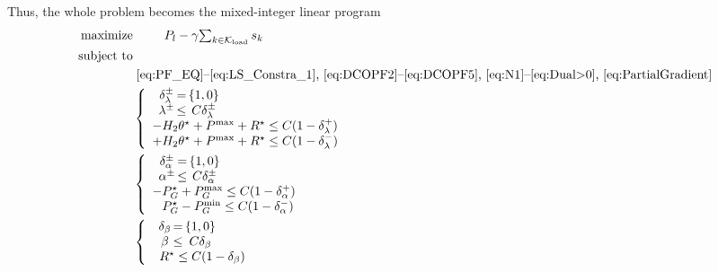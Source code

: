 \documentclass[twocolumn,english,final,journal]{IEEEtran}
\theoremstyle{plain}
\theoremstyle{definition}
\begin{document}
Thus, the whole problem becomes the mixed-integer linear program
\begin{align}
\mbox{maximize}\;\:\qquad & P_{l}-\gamma\mbox{\ensuremath{\sum_{k\in\mathcal{K}_{\textrm{load}}}s_{k}}}\nonumber \\
\mbox{ subject to\qquad\,\ }\nonumber \\
 & \mbox{\negthickspace\negthickspace\negthickspace\negthickspace\negthickspace\negthickspace\negthickspace\negthickspace\eqref{eq:PF_EQ}--\eqref{eq:LS_Constra_1}, \eqref{eq:DCOPF2}--\eqref{eq:DCOPF5}, \eqref{eq:N1}--\mbox{\eqref{eq:Dual>0}, \eqref{eq:PartialGradient}}}\nonumber \\
 & \negthickspace\negthickspace\negthickspace\negthickspace\negthickspace\negthickspace\negthickspace\negthickspace\negthickspace\left\{ \begin{array}{l}
\begin{array}{ccc}
\delta_{\lambda}^{\pm} & \negthickspace\negthickspace\negthickspace= & \negthickspace\negthickspace\negthickspace\{1,0\}\\
\lambda^{\pm} & \negthickspace\negthickspace\negthickspace\leq & \negthickspace\negthickspace\negthickspace C\delta_{\lambda}^{\pm}
\end{array}\\
-H_{2}\theta^{\star}+P^{\max}+R^{\star}\leq C(1-\delta_{\lambda}^{+})\\
+H_{2}\theta^{\star}+P^{\max}+R^{\star}\leq C(1-\delta_{\lambda}^{-})
\end{array}\right.\label{eq:LinearComplementary1}\\
 & \negthickspace\negthickspace\negthickspace\negthickspace\negthickspace\negthickspace\negthickspace\negthickspace\negthickspace\left\{ \begin{array}{l}
\begin{array}{ccc}
\delta_{\alpha}^{\pm} & \negthickspace\negthickspace\negthickspace= & \negthickspace\negthickspace\negthickspace\{1,0\}\\
\alpha^{\pm} & \negthickspace\negthickspace\negthickspace\leq & \negthickspace\negthickspace\negthickspace C\delta_{\alpha}^{\pm}
\end{array}\\
-P_{G}^{\star}+P_{G}^{\max}\leq C(1-\delta_{\alpha}^{+})\\
\;\:\; P_{G}^{\star}-P_{G}^{\min}\leq C(1-\delta_{\alpha}^{-})
\end{array}\right.\\
 & \negthickspace\negthickspace\negthickspace\negthickspace\negthickspace\negthickspace\negthickspace\negthickspace\negthickspace\left\{ \begin{array}{l}
\begin{array}{ccc}
\delta_{\beta} & \negthickspace\negthickspace\negthickspace= & \negthickspace\negthickspace\negthickspace\{1,0\}\\
\beta & \negthickspace\negthickspace\negthickspace\leq & \negthickspace\negthickspace\negthickspace C\delta_{\beta}
\end{array}\\
\;\; R^{\star}\leq C(1-\delta_{\beta})
\end{array}\right.\label{eq:LinearComplementary2}
\end{align}
\end{document}
